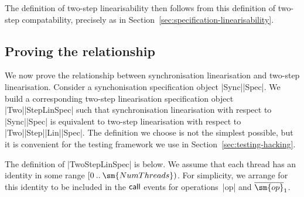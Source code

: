 The definition of two-step linearisability then follows from this definition
of two-step compatability, precisely as in
Section~\ref{sec:specification-linearisability}.



\subsection{Proving the relationship}
\label{sec:twoStepLinSpec}

We now prove the relationship between synchronisation linearisation and
two-step linearisation.
%
Consider a synchonisation specification object |Sync|\-|Spec|.  We build a
corresponding two-step linearisation specification object |Two|\-|StepLinSpec|
such that synchronisation linearisation with respect to |Sync|\-|Spec| is
equivalent to two-step linearisation with respect to
|Two|\-|Step|\-|Lin|\-|Spec|.  The definition we choose is not the simplest
possible, but it is convenient for the testing framework we use in
Section~\ref{sec:testing-hacking}.

The definition of |TwoStepLinSpec| is below.  We assume that each thread has
an identity in some range $\range 0 {\sm{NumThreads}}$.  For simplicity, we
arrange for this identity to be included in the $\mathsf{call}$ events for
operations~|op| and $\overline{\sm{op}}_1$.

